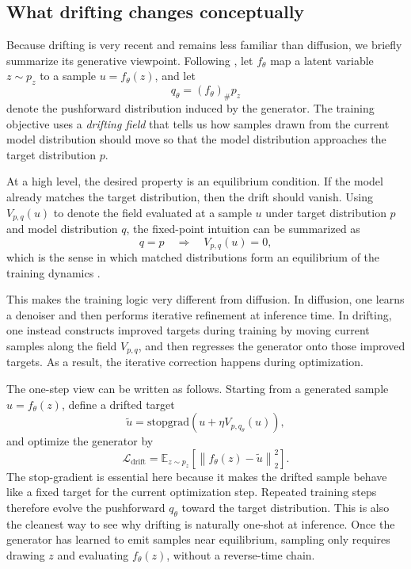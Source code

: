 \documentclass[10pt,journal]{IEEEtran}
\begin{document}
\subsection{What drifting changes conceptually}
Because drifting is very recent and remains less familiar than diffusion, we briefly summarize its generative viewpoint.
Following \cite{drifting}, let \(f_\theta\) map a latent variable \(z \sim p_z\) to a sample \(u = f_\theta(z)\), and let
\begin{equation}
q_\theta = (f_\theta)_\# p_z
\end{equation}
denote the pushforward distribution induced by the generator.
The training objective uses a \emph{drifting field} that tells us how samples drawn from the current model distribution should move so that the model distribution approaches the target distribution \(p\).

At a high level, the desired property is an equilibrium condition.
If the model already matches the target distribution, then the drift should vanish.
Using \(V_{p,q}(u)\) to denote the field evaluated at a sample \(u\) under target distribution \(p\) and model distribution \(q\), the fixed-point intuition can be summarized as
\begin{equation}
q = p
\quad \Longrightarrow \quad
V_{p,q}(u) = 0,
\end{equation}
which is the sense in which matched distributions form an equilibrium of the training dynamics \cite{drifting}.

This makes the training logic very different from diffusion.
In diffusion, one learns a denoiser and then performs iterative refinement at inference time.
In drifting, one instead constructs improved targets during training by moving current samples along the field \(V_{p,q}\), and then regresses the generator onto those improved targets.
As a result, the iterative correction happens during optimization.

The one-step view can be written as follows.
Starting from a generated sample \(u = f_\theta(z)\), define a drifted target
\begin{equation}
\tilde{u}
=
\mathrm{stopgrad}\!\left(
u + \eta V_{p,q_\theta}(u)
\right),
\end{equation}
and optimize the generator by
\begin{equation}
\mathcal{L}_{\text{drift}}
=
\mathbb{E}_{z \sim p_z}
\left[
\left\|
f_\theta(z) - \tilde{u}
\right\|_2^2
\right].
\end{equation}
The stop-gradient is essential here because it makes the drifted sample behave like a fixed target for the current optimization step.
Repeated training steps therefore evolve the pushforward \(q_\theta\) toward the target distribution.
This is also the cleanest way to see why drifting is naturally one-shot at inference.
Once the generator has learned to emit samples near equilibrium, sampling only requires drawing \(z\) and evaluating \(f_\theta(z)\), without a reverse-time chain.
\end{document}
